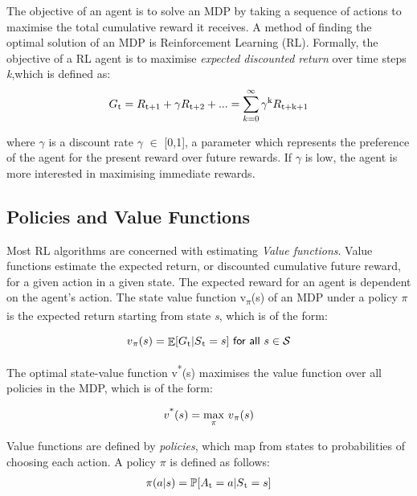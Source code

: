\documentclass[11pt,twoside]{report}
\theoremstyle{plain}
\theoremstyle{definition}
\DeclareMathOperator{\E}{\mathbb{E}}
\newtheorem{examp}{Example}[section]
\begin{document}
The objective of an agent is to solve an MDP by taking a sequence of actions to maximise the total cumulative reward it receives. 
A method of finding the optimal solution of an MDP is Reinforcement Learning (RL). 
Formally, the objective of a RL agent is to maximise \textit{expected discounted return} over time steps \textit{k},which is defined as:
\begin{equation}
\begin{split}
G\textsubscript{t} = R\textsubscript{t+1} + \gamma R \textsubscript{t+2} + ...  = \sum_{k=0}^{\infty} \gamma\textsuperscript{k} R\textsubscript{t+k+1} 
\end{split}
\end{equation}

where $\gamma$ is a discount rate $\gamma$ $\in$ [0,1], a parameter which represents the preference of the agent for the present reward over future rewards. If $\gamma$ is low, the agent is more interested in maximising immediate rewards. 

\subsection{Policies and Value Functions}
\label{policy_value_functions_subsection}
Most RL algorithms are concerned with estimating \textit{Value functions}.
Value functions estimate the expected return, or discounted cumulative future reward,  for a given action in a given state. The expected reward for an agent is dependent on the agent's action.  
The state value function v\textsubscript{$\pi$}(s) of an MDP under a policy $\pi$ is the expected return starting from state \textit{s}, which is of the form:

\begin{equation}
v\textsubscript{$\pi$}(s) = \displaystyle \E [G\textsubscript{t} \vert S\textsubscript{t} = s] \ \textsf{for all}\ s \in \mathcal{S}
\end{equation}

The optimal state-value function v\textsuperscript{*}(s) maximises the value function over all policies in the MDP, which is of the form:

\begin{equation}
v\textsuperscript{*}(s) = \underset{\pi}{\max} \ v\textsubscript{$\pi$}(s)
\end{equation}


Value functions are defined by \textit{policies}, which map from states to probabilities of choosing each action. 
A policy $\pi$ is defined as follows:
\begin{equation}
\label{eq:policy}
\begin{split}
\pi(a|s) =  \displaystyle \mathbb{P}[A\textsubscript{t} = a | S\textsubscript{t} = s]
\end{split}
\end{equation}
\end{document}

